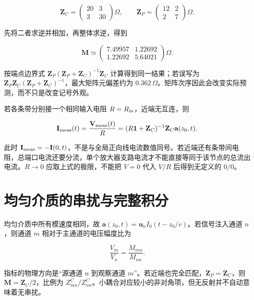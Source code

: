 \documentclass[
  11pt,
  a4paper,
  oneside,
  openany]{report}
\numberwithin{equation}{chapter}
\begin{document}
\[
\mathbf Z_C=\begin{pmatrix}20&3\\3&30\end{pmatrix}\Omega,
\qquad \mathbf Z_P=\begin{pmatrix}12&2\\2&7\end{pmatrix}\Omega.
\]

先将二者求逆并相加，再整体求逆，得到

\[
\mathbf M\simeq\begin{pmatrix}7.49957&1.22692\\1.22692&5.64021\end{pmatrix}\Omega.
\]

按端点边界式 \(\mathbf Z_P(\mathbf Z_P+\mathbf Z_C)^{-1}\mathbf Z_C\)
计算得到同一结果；若误写为
\(\mathbf Z_P\mathbf Z_C(\mathbf Z_P+\mathbf Z_C)^{-1}\)，最大矩阵元偏差约为
\(0.362\,\Omega\)。矩阵次序因此会改变实际预测，而不只是改变记号外观。

若各条带分别接一个相同输入电阻 \(R=R_{\rm in}\)，近端无互连，则

\nopagebreak[3]
\begin{equation}
\mathbf I_{\rm meas}(t)=\frac{\mathbf V_{\rm meas}(t)}{R}
=(R\mathbf1+\mathbf Z_C)^{-1}\mathbf Z_C\mathbf a(z_0,t).
\end{equation}

此时
\(\mathbf I_{\rm meas}=-\mathbf I(0,t)\)，不是与全局正向线电流数值同号。若近端还有条带间电阻，总端口电流还要分流，单个放大器支路电流才不能直接等同于该节点的总流出电流。\(R\to0\)
应取上式的极限，不能把 \(V=0\) 代入 \(V/R\) 后得到无定义的 \(0/0\)。

\section{均匀介质的串扰与完整积分}\label{sec-crosstalk-integral}

均匀介质中所有模速度相同，故
\(\mathbf a(z_0,t)=\mathbf u_nI_0(t-z_0/v)\)。若信号注入通道
\(n\)，则通道 \(m\) 相对于主通道的电压幅度比为

\nopagebreak[3]
\begin{equation}
\frac{V_m}{V_n}=\frac{M_{mn}}{M_{nn}}.
\end{equation}

指标的物理方向是``源通道 \(n\) 到观察通道
\(m\)''。若近端也完全匹配，\(\mathbf Z_P=\mathbf Z_C\)，则
\(\mathbf M=\mathbf Z_C/2\)，比例为
\(Z^C_{mn}/Z^C_{nn}\)。小耦合对应较小的非对角项，但无反射并不自动意味着无串扰。
\end{document}
